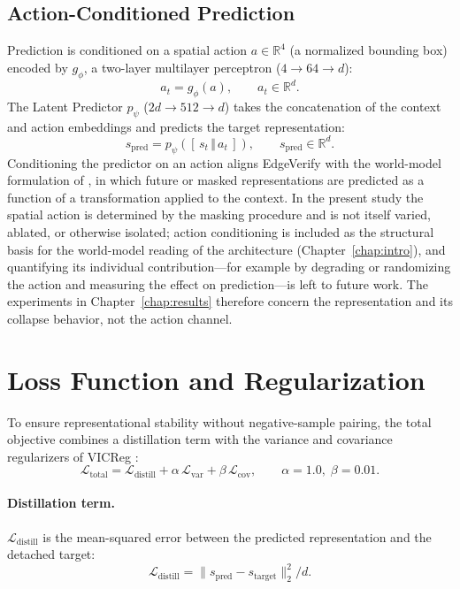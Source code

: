 \subsection{Action-Conditioned Prediction}
Prediction is conditioned on a spatial action
$a \in \mathbb{R}^{4}$ (a normalized bounding box) encoded by $g_\phi$,
a two-layer multilayer perceptron ($4 \rightarrow 64 \rightarrow d$):
\begin{equation}
    a_t = g_\phi(a), \qquad a_t \in \mathbb{R}^{d}.
\end{equation}
The Latent Predictor $p_\psi$ ($2d \rightarrow 512 \rightarrow d$) takes the
concatenation of the context and action embeddings and predicts the target
representation:
\begin{equation}
    s_{\text{pred}} = p_\psi\!\left(\left[\,s_t \,\Vert\, a_t\,\right]\right),
    \qquad s_{\text{pred}} \in \mathbb{R}^{d}.
\end{equation}
Conditioning the predictor on an action aligns EdgeVerify with the
world-model formulation of \cite{lecun2022path}, in which future or masked
representations are predicted as a function of a transformation applied to
the context. In the present study the spatial action is determined by the
masking procedure and is not itself varied, ablated, or otherwise isolated;
action conditioning is included as the structural basis for the world-model
reading of the architecture (Chapter~\ref{chap:intro}), and quantifying its
individual contribution---for example by degrading or randomizing the action
and measuring the effect on prediction---is left to future work. The
experiments in Chapter~\ref{chap:results} therefore concern the
representation and its collapse behavior, not the action channel.

\section{Loss Function and Regularization}
To ensure representational stability without negative-sample pairing, the
total objective combines a distillation term with the variance and
covariance regularizers of VICReg \cite{bardes2022vicreg}:
\begin{equation}
    \mathcal{L}_{\text{total}}
    = \mathcal{L}_{\text{distill}}
    + \alpha\,\mathcal{L}_{\text{var}}
    + \beta\,\mathcal{L}_{\text{cov}},
    \qquad \alpha = 1.0,\; \beta = 0.01.
    \label{eq:total}
\end{equation}

\paragraph{Distillation term.}
$\mathcal{L}_{\text{distill}}$ is the mean-squared error between the
predicted representation and the detached target:
\begin{equation}
    \mathcal{L}_{\text{distill}}
    = \big\lVert s_{\text{pred}} - s_{\text{target}} \big\rVert_2^2 \big/ d .
\end{equation}

